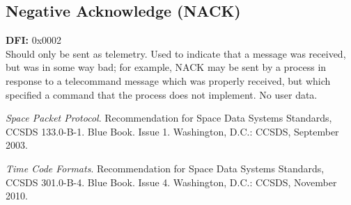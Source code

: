 \documentclass[12pt]{article}
\begin{document}
\subsection{Negative Acknowledge (NACK)}
\textbf{DFI:} 0x0002\\
Should only be sent as telemetry. Used to indicate that a message was received, but was in some way bad; for example, NACK may be sent by a process in response to a telecommand message which was properly received, but which specified a command that the process does not implement. No user data.

\newpage
\begin{thebibliography}{9}
	\textit{Space Packet Protocol}. Recommendation for Space Data Systems Standards, CCSDS
	133.0-B-1. Blue Book. Issue 1. Washington, D.C.: CCSDS, September 2003. 
	
	\textit{Time Code Formats}. Recommendation for Space Data Systems Standards, CCSDS
	301.0-B-4. Blue Book. Issue 4. Washington, D.C.: CCSDS, November 2010. 
\end{thebibliography}
\end{document}
